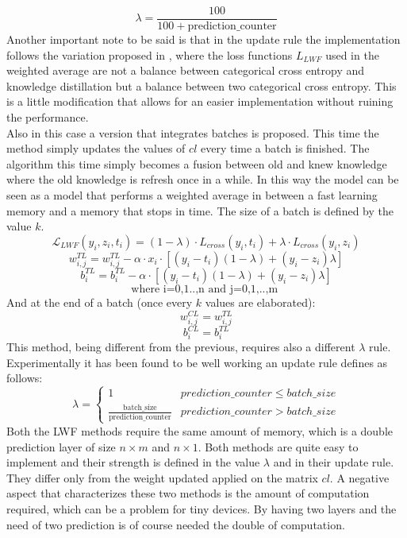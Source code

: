 \documentclass[12pt]{report}
\begin{document}
\[ \lambda = \frac{100}{100+ \text{prediction$\_$counter}} \]
Another important note to be said is that in the update rule the implementation follows the variation proposed in \cite{maltoni2019continuous}, where the loss functions ${L}_{LWF}$ used in the weighted average are not a balance between categorical cross entropy and knowledge distillation but a balance between two categorical cross entropy. This is a little modification that allows for an easier implementation without ruining the performance. \\
Also in this case a version that integrates batches is proposed. This time the method simply updates the values of $cl$ every time a batch is finished. The  algorithm this time simply becomes a fusion between old and knew knowledge where the old knowledge is refresh once in a while. In this way the model can be seen as a model that performs a weighted average in between a fast learning memory and a memory that stops in time. The size of a batch is defined by the value $k$. 
%
\[    \mathcal{L}_{LWF} ( y_i, z_i, t_i) =  (1-\lambda) \cdot{L}_{cross}(y_i, t_i) + \lambda \cdot{L}_{cross}(y_i, z_i) \]
\[ w^{TL}_{i,j} = w^{TL}_{i,j} - \alpha \cdot x_i \cdot [ (y_i - t_i)(1-\lambda) + (y_i - z_i)\lambda]  \]
\[ b^{TL}_i = b^{TL}_i - \alpha \cdot [ (y_i - t_i)(1-\lambda) + (y_i - z_i)\lambda] \]
\[ \text{where i=0,1..,n  and  j=0,1,..,m } \]
%
And at the end of a batch (once every $k$ values are elaborated):
\[ w^{CL}_{i,j} = w^{TL}_{i,j}  \]
\[ b^{CL}_i = b^{TL}_i  \]
This method, being different from the previous, requires also a different $\lambda$ rule. Experimentally it has been found to be well working an update rule defines as follows:
\begin{equation}
\lambda = \left\{
        		\begin{array}{ll}
            		1                                                         & prediction \_ counter \leq batch \_ size \\
            		\frac{\text{batch$\_$size}}{\text{prediction$\_$counter}} & prediction \_ counter >    batch \_ size
        		\end{array}
    		  \right.
\end{equation}
Both the LWF methods require the same amount of memory, which is a double prediction layer of size  $n \times m$ and $n \times 1$. Both methods are quite easy to implement and their strength is defined in the value $\lambda$ and in their update rule. They differ only from the weight updated applied on the matrix $cl$. A negative aspect that characterizes these two methods is the amount of computation required, which can be a problem for tiny devices. By having two layers and the need of two prediction is of course needed the double of computation. 
\end{document}
